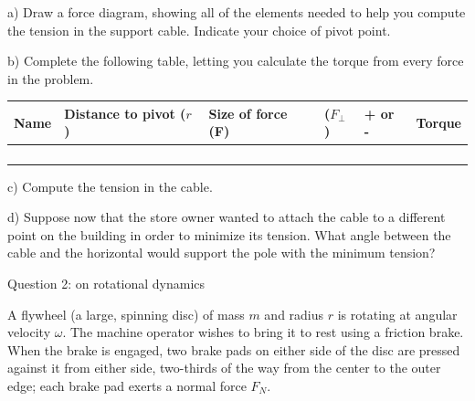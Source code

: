 \documentclass[12pt]{article}
\begin{document}
\bigskip
\bigskip

\newpage

a) Draw a force diagram, showing all of the elements needed to help you compute the tension in the support cable. Indicate
your choice of pivot point.

\vspace{5in}

b) Complete the following table, letting you calculate the torque from every force in the problem. 

\Large
\begin{center}
\begin{tabular}{|l|l|l|l|l|l|}
\hline
Name & Distance to pivot ($r$) & Size of force (F) & ($F_\perp$) & + or - & {\bf Torque} \\ \hline
              &                         &                        &                                              &                    &                               \\ \hline
              &                         &                        &                                              &                    &                               \\ \hline
              &                         &                        &                                              &                    &                               \\ \hline
              &                         &                        &                                              &                    &                               \\ \hline
\end{tabular}
\end{center}
\normalsize
\newpage
c) Compute the tension in the cable.

\vspace{4 in}

d) Suppose now that the store owner wanted to attach the cable to a different point on the building in order to minimize its tension. What angle between the
cable and the horizontal would support the pole with the minimum tension?
\newpage

\centerline{\large Question 2: on rotational dynamics}
A flywheel (a large, spinning disc) of mass $m$ and radius $r$ is rotating
at angular velocity $\omega$. The machine operator wishes to bring it to rest using a friction brake. When the brake
is engaged, two brake pads on either side of the disc are pressed against it from either side, two-thirds
of the way from the center to the outer edge; each brake pad
exerts a normal force $F_N$.
\end{document}
